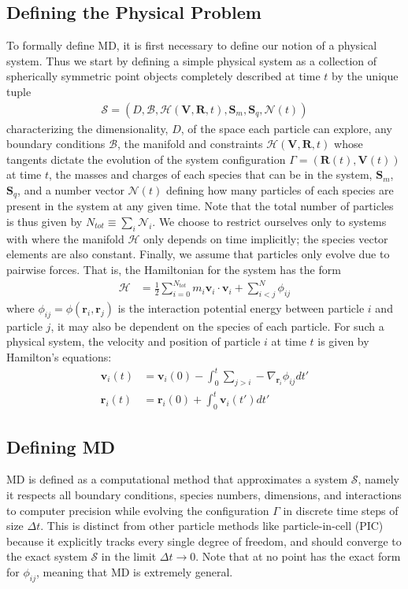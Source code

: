 \documentclass[%
 reprint,
 amsmath,amssymb,
 aps,
pra,
prb,
rmp,
prstab,
prstper,
]{revtex4-1}
\newcommand{\haml}{\mathcal{H}}
\newcommand{\vc}[1]{\mathbf{#1}}
\begin{document}
\subsection{\label{sec:level2}Defining the Physical Problem}
To formally define MD, it is first necessary to define our notion of a physical system. 
Thus we start by defining a simple physical system as a collection of spherically
symmetric point objects completely described at time $t$ by the unique tuple 
\label{eq1}
\begin{align}
\mathcal{S}=(D, \mathcal{B}, \haml(\vc{V}, \vc{R}, t), 
\vc{S}_{m}, \vc{S}_{q}, \vc{\mathcal{N}}(t))
\end{align} 
characterizing the dimensionality, $D$, of the space each particle can explore, 
any boundary conditions $\mathcal{B}$, the manifold and constraints $\haml(\vc{V}, 
\vc{R}, t)$ whose tangents dictate the evolution of the system configuration
$\Gamma = (\vc{R}(t), \vc{V}(t))$ at time $t$, the masses and charges of each species 
that can be in the system,  $\vc{S}_{m}$,  $\vc{S}_{q}$, and a number vector 
$\vc{\mathcal{N}}(t)$ defining how many particles of each species are present in the system at any given time. Note that the total number of particles is thus given by 
$N_{tot}\equiv\sum_{i}\mathcal{N}_{i}$. We choose  to restrict ourselves only to 
systems with where the manifold $\haml$ only depends on time implicitly; the 
species vector elements are also constant. Finally, we assume that 
particles only evolve due to pairwise forces. That is, the Hamiltonian for the system 
has the form
\label{eq2}
\begin{align}
\haml &= \frac{1}{2}\sum_{i=0}^{N_{tot}}m_{i}\vc{v}_{i}\cdot\vc{v}_{i}
+\sum_{i<j}^{N}\phi_{ij}
\end{align}
where $\phi_{ij} = \phi(\vc{r}_{i}, \vc{r}_j)$ is the interaction potential energy
between particle $i$ and particle $j$, it may also be dependent on the
species of each particle.  For such a physical system, the velocity and position of 
particle $i$ at time $t$ is given by Hamilton's equations:
\label{eq3}
\begin{align}
\vc{v}_{i}(t) &= \vc{v}_{i}(0) - \int_{0}^{t}\sum_{j>i}-\nabla_{\vc{r}_{i}}\phi_{ij}dt'\\
\vc{r}_{i}(t) &= \vc{r}_{i}(0) + \int_{0}^{t}\vc{v}_{i}(t')dt'
\end{align}

\subsection{\label{sec:level2}Defining MD}
MD is defined as a computational method that approximates a system $\mathcal{S}$,
namely it respects all boundary conditions, species numbers, dimensions, and interactions to computer precision while evolving the configuration $\Gamma$ in discrete time steps of size $\Delta t$. This is distinct from other particle methods like particle-in-cell
(PIC)\cite{hockney} because it explicitly tracks every single degree of freedom, and
should converge to the exact system $\mathcal{S}$ in the limit $\Delta t\rightarrow0$.
Note that at no point has the exact form for $\phi_{ij}$, meaning that MD is 
extremely general.
\end{document}
